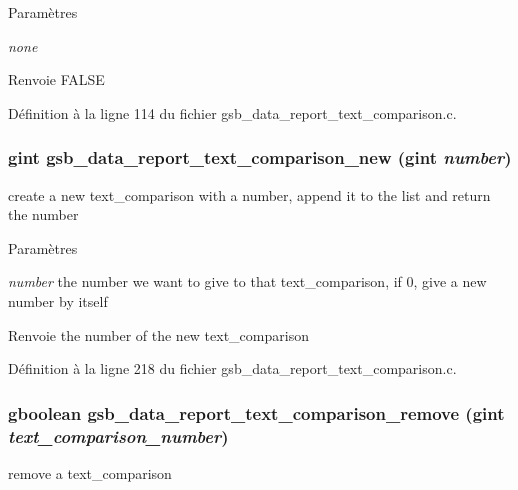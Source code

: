 \begin{DoxyParams}{Paramètres}
\item[{\em none}]\end{DoxyParams}
\begin{DoxyReturn}{Renvoie}
FALSE 
\end{DoxyReturn}


Définition à la ligne 114 du fichier gsb\_\-data\_\-report\_\-text\_\-comparison.c.

\subsubsection[{gsb\_\-data\_\-report\_\-text\_\-comparison\_\-new}]{\setlength{\rightskip}{0pt plus 5cm}gint gsb\_\-data\_\-report\_\-text\_\-comparison\_\-new (gint {\em number})}\label{gsb__data__report__text__comparison_8h_af35ca9a6b7fcb4c502c7307cff60b7f4}
create a new text\_\-comparison with a number, append it to the list and return the number


\begin{DoxyParams}{Paramètres}
\item[{\em number}]the number we want to give to that text\_\-comparison, if 0, give a new number by itself\end{DoxyParams}
\begin{DoxyReturn}{Renvoie}
the number of the new text\_\-comparison 
\end{DoxyReturn}


Définition à la ligne 218 du fichier gsb\_\-data\_\-report\_\-text\_\-comparison.c.

\subsubsection[{gsb\_\-data\_\-report\_\-text\_\-comparison\_\-remove}]{\setlength{\rightskip}{0pt plus 5cm}gboolean gsb\_\-data\_\-report\_\-text\_\-comparison\_\-remove (gint {\em text\_\-comparison\_\-number})}\label{gsb__data__report__text__comparison_8h_a7eebd5fca03217c83bd7cbbbfee5ea95}
remove a text\_\-comparison


